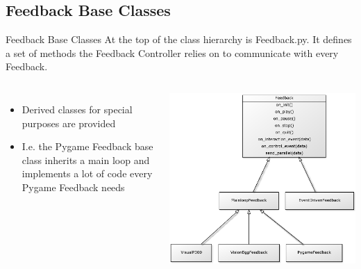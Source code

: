 \documentclass{beamer}
\begin{document}
\subsection{Feedback Base Classes}
\begin{frame}{Feedback Base Classes}
    At the top of the class hierarchy is \alert{Feedback.py}. It defines a set
    of methods the Feedback Controller relies on to communicate with every
    Feedback.
    \begin{columns}[T]
            \begin{itemize}
                \item Derived classes for special purposes are provided
                \item I.e. the Pygame Feedback base class inherits a main loop
                    and implements a lot of code every Pygame Feedback needs
            \end{itemize}
            \includegraphics[width=\linewidth]{feedback_class_hierarchy}
   \end{columns}
\end{frame}
\end{document}
